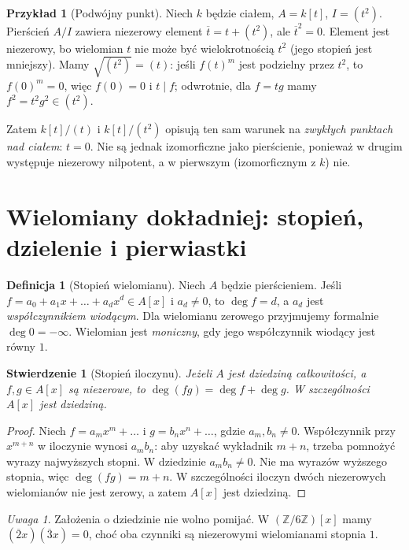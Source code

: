 \documentclass[11pt,a4paper,openany]{report}
\numberwithin{equation}{section}
\theoremstyle{plain}
\newtheorem{stwierdzenie}[twierdzenie]{Stwierdzenie}
\theoremstyle{definition}
\newtheorem{definicja}[twierdzenie]{Definicja}
\newtheorem{przyklad}[twierdzenie]{Przykład}
\theoremstyle{remark}
\newtheorem{uwaga}[twierdzenie]{Uwaga}
\newcommand{\Z}{\mathbb Z}
\begin{document}
\begin{przyklad}[Podwójny punkt]
Niech $k$ będzie ciałem, $A=k[t]$, $I=(t^2)$.
Pierścień $A/I$ zawiera niezerowy element $\overline t=t+(t^2)$,
ale $\overline t^2=0$. Element jest niezerowy,
bo wielomian $t$ nie może być wielokrotnością $t^2$
(jego stopień jest mniejszy).
Mamy $\sqrt{(t^2)}=(t)$: jeśli $f(t)^m$ jest podzielny przez $t^2$,
to $f(0)^m=0$, więc $f(0)=0$ i $t\mid f$;
odwrotnie, dla $f=tg$ mamy $f^2=t^2g^2\in(t^2)$.

Zatem $k[t]/(t)$ i $k[t]/(t^2)$ opisują ten sam warunek
na \emph{zwykłych punktach nad ciałem}: $t=0$.
Nie są jednak izomorficzne jako pierścienie, ponieważ w drugim
występuje niezerowy nilpotent, a w pierwszym (izomorficznym z $k$) nie.
\end{przyklad}

\section{Wielomiany dokładniej: stopień, dzielenie i pierwiastki}

\begin{definicja}[Stopień wielomianu]
Niech $A$ będzie pierścieniem. Jeśli
$f=a_0+a_1x+\dots+a_dx^d\in A[x]$ i $a_d\ne0$,
to $\deg f=d$, a $a_d$ jest \emph{współczynnikiem wiodącym}.
Dla wielomianu zerowego przyjmujemy formalnie $\deg0=-\infty$.
Wielomian jest \emph{moniczny}, gdy jego współczynnik wiodący jest równy $1$.
\end{definicja}

\begin{stwierdzenie}[Stopień iloczynu]
Jeżeli $A$ jest dziedziną całkowitości, a $f,g\in A[x]$ są niezerowe,
to $\deg(fg)=\deg f+\deg g$. W szczególności $A[x]$ jest dziedziną.
\end{stwierdzenie}
\begin{proof}
Niech $f=a_mx^m+\dots$ i $g=b_nx^n+\dots$, gdzie $a_m,b_n\ne0$.
Współczynnik przy $x^{m+n}$ w iloczynie wynosi $a_mb_n$:
aby uzyskać wykładnik $m+n$, trzeba pomnożyć wyrazy najwyższych stopni.
W dziedzinie $a_mb_n\ne0$. Nie ma wyrazów wyższego stopnia,
więc $\deg(fg)=m+n$. W szczególności iloczyn dwóch niezerowych
wielomianów nie jest zerowy, a zatem $A[x]$ jest dziedziną.
\end{proof}

\begin{uwaga}
Założenia o dziedzinie nie wolno pomijać. W $(\Z/6\Z)[x]$
mamy $(\overline2x)(\overline3x)=0$, choć oba czynniki są
niezerowymi wielomianami stopnia $1$.
\end{uwaga}
\end{document}
